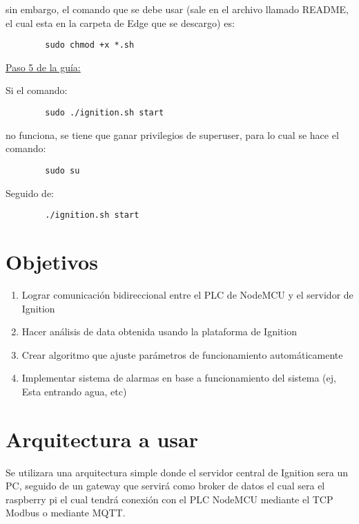 \documentclass[12pt]{article}
\begin{document}
	sin embargo, el comando que se debe usar (sale en el archivo llamado README, el cual esta en la carpeta de Edge que se descargo) es:
	
	\begin{verbatim}
		sudo chmod +x *.sh
	\end{verbatim}
	
	\underline{Paso 5 de la guía:}
	
	\vspace{5mm}
	
	Si el comando: 
	
	\begin{verbatim}
		sudo ./ignition.sh start
	\end{verbatim}
	
	no funciona, se tiene que ganar privilegios de superuser, para lo cual se hace el comando:
	
	\begin{verbatim}
		sudo su
	\end{verbatim}
	
	Seguido de:
	
	\begin{verbatim}
		./ignition.sh start
	\end{verbatim}
	
	\section{Objetivos}
	
	\begin{enumerate}
		\item Lograr comunicación bidireccional entre el PLC de NodeMCU y el servidor de Ignition
		\item Hacer análisis de data obtenida usando la plataforma de Ignition
		\item Crear algoritmo que ajuste parámetros de funcionamiento automáticamente
		\item Implementar sistema de alarmas en base a funcionamiento del sistema (ej, Esta entrando agua, etc)
	\end{enumerate}
	
	\section{Arquitectura a usar}
	
	Se utilizara una arquitectura simple donde el servidor central de Ignition sera un PC, seguido de un gateway que servirá como broker de datos el cual sera el raspberry pi el cual tendrá conexión con el  PLC NodeMCU mediante el TCP Modbus o mediante MQTT.
	
	
\end{document}
